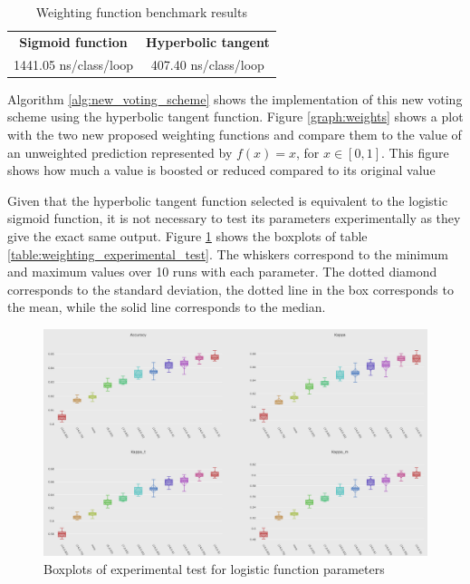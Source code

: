 \begin{table}[]
\centering
\caption{\label{table:weight_benchmark}Weighting function benchmark results}
\begin{tabular}{|c|c|}
\hline
\textbf{Sigmoid function} & \textbf{Hyperbolic tangent} \\ \hhline{==}
1441.05 ns/class/loop & 407.40 ns/class/loop \\ \hline
\end{tabular}
\end{table}

Algorithm \ref{alg:new_voting_scheme} shows the implementation of this new voting scheme using the hyperbolic tangent function. Figure \ref{graph:weights} shows a plot with the two new proposed weighting functions and compare them to the value of an unweighted prediction represented by $f(x) =x$, for  $x \in [0,1]$. This figure shows how much a value is boosted or reduced compared to its original value

Given that the hyperbolic tangent function selected is equivalent to the logistic sigmoid function, it is not necessary to test its parameters experimentally as they give the exact same output. Figure \ref{fig:boxplots_params} shows the boxplots of table \ref{table:weighting_experimental_test}. The whiskers correspond to the minimum and maximum values over 10 runs with each parameter. The dotted diamond corresponds to the standard deviation, the dotted line in the box corresponds to the mean, while the solid line corresponds to the median.

\begin{figure}
  \includegraphics[width=\linewidth]{./images/boxplots_params}
\caption{\label{fig:boxplots_params}Boxplots of experimental test for logistic function parameters}
\end{figure}


